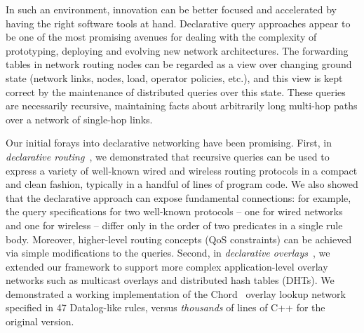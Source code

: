 In such an environment, innovation can be better focused and
accelerated by having the right software tools at hand.  Declarative
query approaches appear to be one of the most promising avenues for
dealing with the complexity of prototyping, deploying and evolving new network architectures.
The forwarding tables in network routing nodes can be regarded as a view over
changing ground state (network links, nodes, load, operator policies,
etc.), and this view is kept correct by the maintenance
of distributed queries over this state.  These queries are necessarily recursive,
maintaining facts about arbitrarily long multi-hop paths over a network of
single-hop links.







Our initial forays into declarative networking have been
promising. First, in {\em declarative routing}~\cite{declareRoute}, we
demonstrated that recursive queries can be used to express a variety
of well-known wired and wireless routing protocols in a compact and
clean fashion, typically in a handful of lines of program code.  We
also showed that the declarative approach can expose fundamental connections: 
for example, the query specifications for two well-known protocols -- one for
wired networks and one for wireless -- differ only in the order of two
predicates in a single rule body.
Moreover, higher-level routing concepts (\eg QoS
constraints) can be achieved via simple modifications to the
queries. Second, in {\em declarative overlays}~\cite{declareOverlays},
we extended our framework to support more complex
application-level overlay networks such as multicast overlays and
distributed hash tables (DHTs). We demonstrated a working
implementation of the Chord~\cite{chord} overlay lookup network
specified in 47 Datalog-like rules, versus {\em thousands} of lines of
C++ for the original version. 

